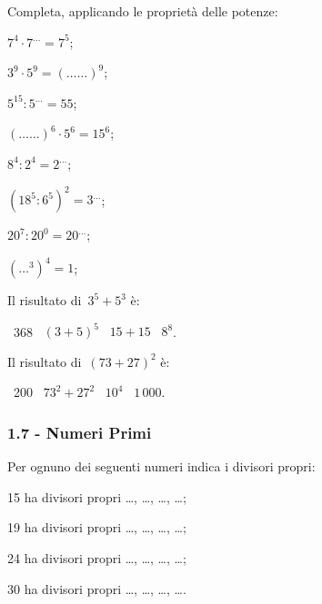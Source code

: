 \pagebreak
\begin{esercizio}
\label{ese:1.12}
 Completa, applicando le proprietà delle potenze:
\begin{multicols}{2}
 \begin{enumeratea}
 \item $7^4\cdot7^{\ldots}=7^5$;
 \item $3^9\cdot5^9=(\ldots\ldots)^9$;
 \item $5^{15}:5^{\ldots}=55$;
 \item $(\ldots\ldots)^6\cdot5^6=15^6$;
 \item $8^4:2^4=2^{\ldots}$;
 \item $\left(18^5:6^5\right)^2=3^{\ldots}$;
 \item $20^7:20^0=20^{\ldots}$;
 \item $\left(\ldots^3\right)^4=1$;
 \end{enumeratea}
\end{multicols}
\end{esercizio}

\begin{esercizio}
\label{ese:1.13}
 Il risultato di~$3^5+5^3$ è:
 \begin{center}
 \boxA\:~368 \quad\boxB\:~$(3+5)^5$ \quad\boxC\:~$15+15$ \quad\boxD\:~$8^8$.
 \end{center}
\end{esercizio}

\begin{esercizio}
\label{ese:1.14}
 Il risultato di~$(73+27)^2$ è:
 \begin{center}
 \boxA\:~200 \quad\boxB\:~$73^2+27^2$ \quad\boxC\:~$10^4$ \quad\boxD\:~$1\,000$.
 \end{center}
\end{esercizio}

\subsubsection*{1.7 - Numeri Primi}
\begin{esercizio}
\label{ese:1.15}
 Per ognuno dei seguenti numeri indica i divisori propri:
  \begin{multicols}{2}
 \begin{enumeratea}
 \item 15 ha divisori propri \ldots, \ldots, \ldots, \ldots;
 \item 19 ha divisori propri \ldots, \ldots, \ldots, \ldots;
 \item 24 ha divisori propri \ldots, \ldots, \ldots, \ldots;
 \item 30 ha divisori propri \ldots, \ldots, \ldots, \ldots.
 \end{enumeratea}
  \end{multicols}
\end{esercizio}

